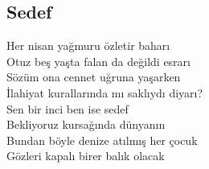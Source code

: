 \subsection{Sedef}

Her nisan yağmuru özletir baharı \\
Otuz beş yaşta falan da değildi esrarı \\
Sözüm ona cennet uğruna yaşarken \\
İlahiyat kurallarında mı saklıydı diyarı? \\

\noindent\newline
Sen bir inci ben ise sedef \\
Bekliyoruz kursağında dünyanın \\
Bundan böyle denize atılmış her çocuk \\
Gözleri kapalı birer balık olacak \\